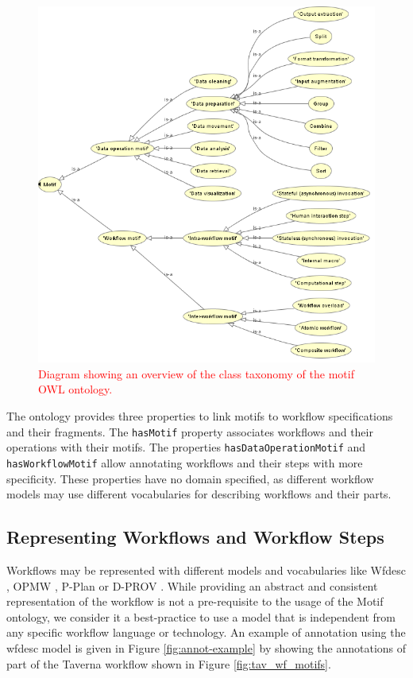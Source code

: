 \begin{figure}[t!]
\centering
\includegraphics[scale=0.60]{Figures/ontology.png}
\caption{\textcolor{red}{Diagram showing an overview of the class taxonomy of the motif OWL ontology.}}
\label{fig:ontology}
\end{figure}  

The ontology provides three properties to link motifs to workflow specifications and their fragments. The {\tt  hasMotif} property associates workflows and their operations with their motifs. The properties {\tt  hasDataOperationMotif} and {\tt  hasWorkflowMotif} allow annotating workflows and their steps with more specificity. These properties have no domain specified, as different workflow models may use different vocabularies for describing workflows and their parts. 

\subsection{Representing Workflows and Workflow Steps}

Workflows may be represented with different models and vocabularies like Wfdesc \cite{ro_model}, OPMW \cite{garijo_gil_2011}, P-Plan  \cite{garijo-gil-lisc12} or D-PROV \cite{Missier2013a}. While providing an abstract and consistent representation of the workflow is not a pre-requisite to the usage of the Motif ontology, we consider it a best-practice to use a model that is independent from any specific workflow language or technology. An example of annotation using the wfdesc model is given in Figure \ref{fig:annot-example} by showing the annotations of part of the Taverna workflow shown in Figure \ref{fig:tav_wf_motifs}. 

